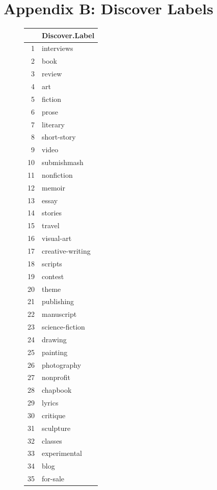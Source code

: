 \documentclass[12pt]{report}   %
\begin{document}
\chapter{Appendix B: Discover Labels}
\begin{figure}[h]
\scriptsize
\begin{minipage}[h]{0.24\textwidth}

\begin{tabular}{rl}
  \hline
 & Discover.Label \\ 
  \hline
1 & interviews \\ 
  2 & book \\ 
  3 & review \\ 
  4 & art \\ 
  5 & fiction \\ 
  6 & prose \\ 
  7 & literary \\ 
  8 & short-story \\ 
  9 & video \\ 
  10 & submishmash \\ 
  11 & nonfiction \\ 
  12 & memoir \\ 
  13 & essay \\ 
  14 & stories \\ 
  15 & travel \\ 
  16 & visual-art \\ 
  17 & creative-writing \\ 
  18 & scripts \\ 
  19 & contest \\ 
  20 & theme \\ 
  21 & publishing \\ 
  22 & manuscript \\ 
  23 & science-fiction \\ 
  24 & drawing \\ 
  25 & painting \\ 
  26 & photography \\ 
  27 & nonprofit \\ 
  28 & chapbook \\ 
  29 & lyrics \\ 
  30 & critique \\ 
  31 & sculpture \\ 
  32 & classes \\ 
  33 & experimental \\ 
  34 & blog \\ 
  35 & for-sale \\ 

\end{tabular}
\end{minipage}
\end{figure}
\end{document}
